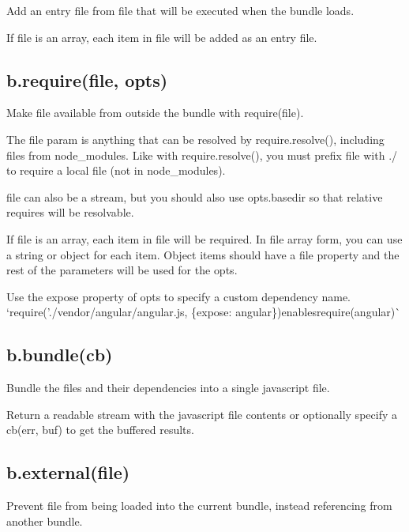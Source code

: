 Add an entry file from {\ttfamily file} that will be executed when the bundle loads.

If {\ttfamily file} is an array, each item in {\ttfamily file} will be added as an entry file.

\subsection*{b.\+require(file, opts)}

Make {\ttfamily file} available from outside the bundle with {\ttfamily require(file)}.

The {\ttfamily file} param is anything that can be resolved by {\ttfamily require.\+resolve()}, including files from {\ttfamily node\+\_\+modules}. Like with {\ttfamily require.\+resolve()}, you must prefix {\ttfamily file} with {\ttfamily ./} to require a local file (not in {\ttfamily node\+\_\+modules}).

{\ttfamily file} can also be a stream, but you should also use {\ttfamily opts.\+basedir} so that relative requires will be resolvable.

If {\ttfamily file} is an array, each item in {\ttfamily file} will be required. In {\ttfamily file} array form, you can use a string or object for each item. Object items should have a {\ttfamily file} property and the rest of the parameters will be used for the {\ttfamily opts}.

Use the {\ttfamily expose} property of opts to specify a custom dependency name. `require('./vendor/angular/angular.js\textquotesingle{}, \{expose\+: \textquotesingle{}angular\textquotesingle{}\}){\ttfamily enables}require(\textquotesingle{}angular\textquotesingle{})\`{}

\subsection*{b.\+bundle(cb)}

Bundle the files and their dependencies into a single javascript file.

Return a readable stream with the javascript file contents or optionally specify a {\ttfamily cb(err, buf)} to get the buffered results.

\subsection*{b.\+external(file)}

Prevent {\ttfamily file} from being loaded into the current bundle, instead referencing from another bundle.

